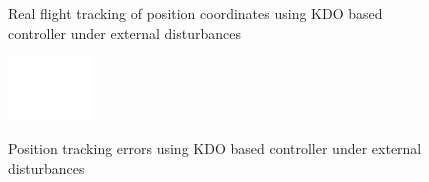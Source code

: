\documentclass[letterpaper%
, twoside%
, 12pt%
,memoire%
, english%
,creativecommons,hyperref%
]{thETS}
\theoremstyle{newThmStyle}
\begin{document}
\begin{figure}[H]
	\centering
	\parbox{0.85\textwidth}{\caption{Real flight tracking of position coordinates using KDO based controller under external disturbances\label{Fig:xyztracKDODist}}}
\end{figure}
\begin{figure}[H]
	\includegraphics[width=0.2\textwidth]{Figures/blank.png}
\end{figure}
\begin{figure}[H]
	\centering
	\parbox{0.75\textwidth}{\caption{Position tracking errors using KDO based controller under external disturbances\label{Fig:xyzerrKDODist}}}
\end{figure}
\end{document}
